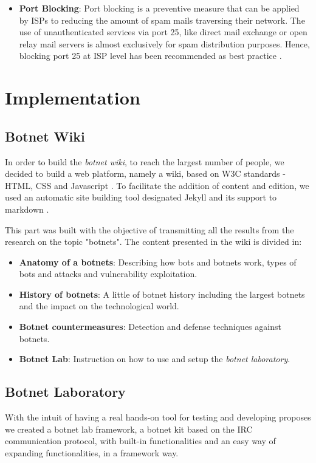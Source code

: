 \documentclass[]{article}
\begin{document}
\begin{itemize}
	\item \textbf{Port Blocking}: Port blocking is a preventive measure that can be applied by ISPs to reducing the amount of spam mails traversing their network. The use of unauthenticated services via port 25, like direct mail exchange or open relay mail servers is almost exclusively for spam distribution purposes. Hence, blocking port 25 at ISP level has been recommended as best practice \cite{article:countermeasures}.
\end{itemize}

\section{Implementation}

\subsection{Botnet Wiki}

In order to build the \textit{botnet wiki}, to reach the largest number of people, we decided to build a web platform, namely a wiki, based on W3C standards - HTML, CSS and Javascript \cite{website:standards}. To facilitate the addition of content and edition, we used an automatic site building tool designated Jekyll \cite{app:jekyll} and its support to markdown \cite{app:markdown}. 

This part was built with the objective of transmitting all the results from the research on the topic "botnets". The content presented in the wiki is divided in:
\begin{itemize}
	\item\textbf{Anatomy of a botnets}: Describing how bots and botnets work, types of bots and attacks and vulnerability exploitation.
	\item \textbf{History of botnets}: A little of botnet history including the largest botnets and the impact on the technological world.
	\item \textbf{Botnet countermeasures}: Detection and defense techniques against botnets.
	\item \textbf{Botnet Lab}: Instruction on how to use and setup the \textit{botnet laboratory}.
\end{itemize}

\subsection{Botnet Laboratory}

With the intuit of having a real hands-on tool for testing and developing proposes we created a botnet lab framework, a botnet kit based on the IRC communication protocol, with built-in functionalities and an easy way of expanding functionalities, in a framework way.
\end{document}
